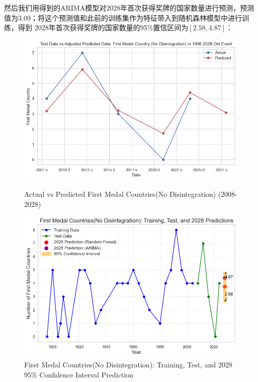 \documentclass[UTF8]{ctexart}
\begin{document}
然后我们用得到的ARIMA模型对2028年首次获得奖牌的国家数量进行预测，预测值为3.09；将这个预测值和此前的训练集作为特征带入到随机森林模型中进行训练，得到
2028年首次获得奖牌的国家数量的95\%置信区间为$[2.58,4.87]$：
\begin{figure}[ht]
  \centering
  \begin{minipage}[b]{0.42\textwidth} %
    \includegraphics[width=\textwidth]{9} %
    \caption{Actual vs Predicted First Medal Countries(No Disintegration) (2008-2028)}
    \label{fig:image-a}
  \end{minipage}
  
  \begin{minipage}[b]{0.42\textwidth} %
    \includegraphics[width=\textwidth]{10} %
    \caption{First Medal Countries(No Disintegration): Training, Test, and 2028 95\% Confidence Interval Prediction}
    \label{fig:image-a}
  \end{minipage}
\end{figure}
\end{document}
